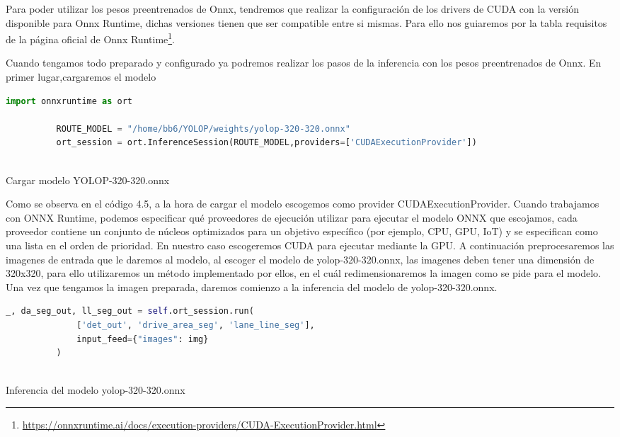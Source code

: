       Para poder utilizar los pesos preentrenados de Onnx, tendremos que realizar la configuración de los drivers de CUDA con la versión disponible para Onnx Runtime, 
      dichas versiones tienen que ser compatible entre si mismas. Para ello nos guiaremos por la tabla requisitos de la página oficial de Onnx Runtime\footnote{\url{https://onnxruntime.ai/docs/execution-providers/CUDA-ExecutionProvider.html}}. \newline

      Cuando tengamos todo preparado y configurado ya podremos realizar los pasos de la inferencia con los pesos preentrenados de Onnx. En primer lugar,cargaremos el modelo
      
      \begin{code}[h]
        \begin{lstlisting}[language=Python]
          import onnxruntime as ort

          ROUTE_MODEL = "/home/bb6/YOLOP/weights/yolop-320-320.onnx"
          ort_session = ort.InferenceSession(ROUTE_MODEL,providers=['CUDAExecutionProvider'])
      
        \end{lstlisting}
        \caption[Cargar modelo]{Cargar modelo YOLOP-320-320.onnx}
        \label{cod:codejemplo}
        \end{code}  

        Como se observa en el código 4.5, a la hora de cargar el modelo escogemos como provider CUDAExecutionProvider. Cuando trabajamos con ONNX Runtime, 
        podemos especificar qué proveedores de ejecución utilizar para ejecutar el modelo ONNX que escojamos, cada proveedor contiene un conjunto de núcleos optimizados para un objetivo específico (por ejemplo, CPU, GPU, IoT) y 
        se especifican como una lista en el orden de prioridad. En nuestro caso escogeremos CUDA para ejecutar mediante la GPU. 
        \newline
        A continuación preprocesaremos las imagenes de entrada que le daremos al modelo, al escoger el modelo de yolop-320-320.onnx, las imagenes deben tener una dimensión de 320x320, para ello
        utilizaremos un método implementado por ellos, en el cuál redimensionaremos la imagen como se pide para el modelo. 
        Una vez que tengamos la imagen preparada, daremos comienzo a la inferencia del modelo de yolop-320-320.onnx. \newline
      
        \begin{code}[h]
          \begin{lstlisting}[language=Python]
            _, da_seg_out, ll_seg_out = self.ort_session.run(
              ['det_out', 'drive_area_seg', 'lane_line_seg'],
              input_feed={"images": img}
          )
        
          \end{lstlisting}
          \caption[Inferencia del modelo yolop-320-320.onnx]{Inferencia del modelo yolop-320-320.onnx}
          \label{cod:codejemplo}
          \end{code}  

